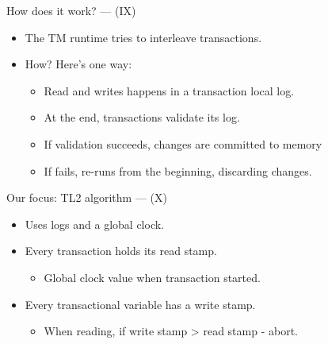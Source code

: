 \documentclass[14pt]{beamer}
\begin{document}
     \begin{frame}{How does it work? --- (IX)}
        \begin{itemize}
           \item The TM runtime tries to interleave transactions.
           \item How? Here's one way:
           \begin{itemize}
              \item Read and writes happens in a transaction local log.
              \item At the end, transactions validate its log.
              \item If validation succeeds, changes are committed to memory
              \item If fails, re-runs from the beginning, discarding changes.
           \end{itemize}
        \end{itemize}
     \end{frame}
     \begin{frame}{Our focus: TL2 algorithm --- (X)}
        \begin{itemize}
           \item Uses logs and a global clock.
           \item Every transaction holds its read stamp.
           \begin{itemize}
              \item Global clock value when transaction started.
           \end{itemize}
           \item Every transactional variable has a write stamp.
           \begin{itemize}
              \item When reading, if write stamp > read stamp - abort.
           \end{itemize}
        \end{itemize}
     \end{frame}
\end{document}
